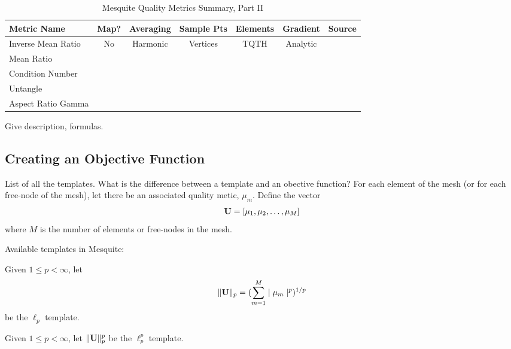 \documentclass[psfig]{article}
\begin{document}
\begin{table}[h]
\begin{center}
\begin{tabular}{|l|c|c|c|c|c|c|}
\hline
Metric Name & Map? & Averaging & Sample Pts & Elements & Gradient & Source \\ \hline
Inverse Mean Ratio & No & Harmonic & Vertices & TQTH & Analytic & \\ 
Mean Ratio &  &  &  &  &  \\ 
Condition Number &  &  &  &  &  \\ 
Untangle &  &  &  &  &  \\ 
Aspect Ratio Gamma &  &  &  &  &  \\ 
\hline
\end{tabular}
\caption{\label{QualityMetrics2} Mesquite Quality Metrics Summary, Part II}
\end{center}
\end{table}

 \newline
Give description, formulas. 

\subsection{Creating an Objective Function}
List of all the templates. What is the difference between a template and
an obective function? For each element of the mesh (or for each 
free-node of the mesh), let there be an associated quality metic, 
$\mu_m$.  Define the vector 
\begin{equation}
{\bf U} = [ \mu_1, \mu_2, \ldots, \mu_M ]
\end{equation}
where $M$ is the number of elements or free-nodes in the mesh. \newline

\noindent Available templates in Mesquite: \newline

 \newline
Given $1 \leq p < \infty$, let
\begin{equation}
\| {\bf U} \|_p = ( \sum_{m=1}^M \mid \mu_m \mid^p )^{1/p}
\end{equation}
be the $\ell_p$ template. \newline

 \newline
Given $1 \leq p < \infty$, let $\| {\bf U} \|_p^p$ be the 
$\ell_p^p$ template. \newline
\end{document}
